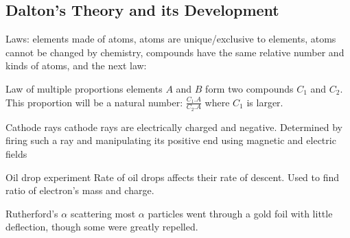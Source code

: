 \begin{mdframed}
\subsection{Dalton's Theory and its Development}
\begin{multicols}{2}
\begin{compactdesc}
\item[Laws:] elements made of atoms, atoms are unique/exclusive to elements,
    atoms cannot be changed by chemistry, compounds have the same relative
    number and kinds of atoms, and the next law:
\item[Law of multiple proportions] elements $A$ and $B$ form two compounds $C_1$
    and $C_2$. This proportion will be a natural number: $\frac{C_1.A}{C_2.A}$
    where $C_1$ is larger.
\item[Cathode rays] cathode rays are electrically charged and negative.
    Determined by firing such a ray and manipulating its positive end using
    magnetic and electric fields
\item[Oil drop experiment] Rate of oil drops affects their rate of descent.
    Used to find ratio of electron's mass and charge.
\item[Rutherford's $\alpha$ scattering] most $\alpha$ particles went through
    a gold foil with little deflection, though some were greatly repelled.
\end{compactdesc}
\end{multicols}
\end{mdframed}



